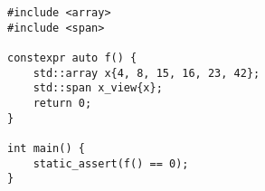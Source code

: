 \begin{lstlisting}[title=\href{https://godbolt.org/z/rso3na}{\texttt{godbolt.org/z/rso3na}}]
#include <array>
#include <span>

constexpr auto f() {
    std::array x{4, 8, 15, 16, 23, 42};
    std::span x_view{x};
    return 0;
}

int main() {
    static_assert(f() == 0);
}
\end{lstlisting}
